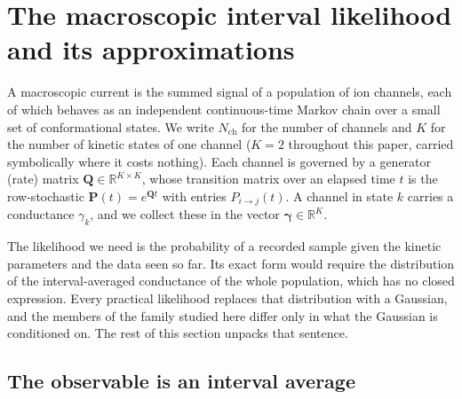 \section*{The macroscopic interval likelihood and its approximations}

A macroscopic current is the summed signal of a population of ion channels, each of
which behaves as an independent continuous-time Markov chain over a small set of
conformational states. We write $N_{\mathrm{ch}}$ for the number of channels and $K$ for
the number of kinetic states of one channel ($K=2$ throughout this paper, carried %
symbolically where it costs nothing). Each channel is governed by a generator (rate)
matrix $\mathbf{Q}\in\mathbb{R}^{K\times K}$, whose transition matrix over an elapsed time
$t$ is the row-stochastic $\mathbf{P}(t)=e^{\mathbf{Q}t}$ with entries $P_{i\to j}(t)$. A
channel in state $k$ carries a conductance $\gamma_k$, and we collect these in the vector
$\bm{\gamma}\in\mathbb{R}^{K}$.

The likelihood we need is the probability of a recorded sample given the kinetic
parameters and the data seen so far. Its exact form would require the distribution of the
interval-averaged conductance of the whole population, which has no closed expression.
Every practical likelihood replaces that distribution with a Gaussian, and the members of
the family studied here differ only in what the Gaussian is conditioned on. The rest of
this section unpacks that sentence.

\subsection*{The observable is an interval average}

